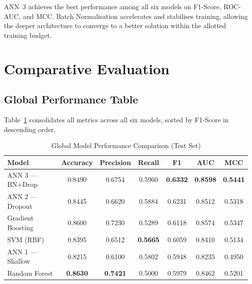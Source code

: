 ANN~3 achieves the best performance among all six models on F1-Score, ROC-AUC, and MCC. Batch Normalisation accelerates and stabilises training, allowing the deeper architecture to converge to a better solution within the allotted training budget.

\section{Comparative Evaluation}

\subsection{Global Performance Table}

Table~\ref{tab:global_comparison} consolidates all metrics across all six models, sorted by F1-Score in descending order.

\begin{table}[H]
    \centering
    \caption{Global Model Performance Comparison (Test Set)}
    \label{tab:global_comparison}
    \vspace{3mm}
    \renewcommand{\arraystretch}{1.3}
    \begin{tabular}{|l|c|c|c|c|c|c|}
        \hline
        \rowcolor[gray]{0.85}
        \textbf{Model} & \textbf{Accuracy} & \textbf{Precision} & \textbf{Recall} & \textbf{F1} & \textbf{AUC} & \textbf{MCC} \\
        \hline
        ANN 3 — BN+Drop     & 0.8490 & 0.6754 & 0.5960 & \textbf{0.6332} & \textbf{0.8598} & \textbf{0.5441} \\
        \hline
        ANN 2 — Dropout      & 0.8445 & 0.6620 & 0.5884 & 0.6231 & 0.8512 & 0.5318 \\
        \hline
        Gradient Boosting    & 0.8600 & 0.7230 & 0.5289 & 0.6118 & 0.8574 & 0.5347 \\
        \hline
        SVM (RBF)            & 0.8395 & 0.6512 & \textbf{0.5665} & 0.6059 & 0.8410 & 0.5134 \\
        \hline
        ANN 1 — Shallow      & 0.8215 & 0.6100 & 0.5802 & 0.5948 & 0.8235 & 0.4950 \\
        \hline
        Random Forest        & \textbf{0.8630} & \textbf{0.7421} & 0.5000 & 0.5979 & 0.8462 & 0.5201 \\
        \hline
    \end{tabular}
\end{table}

